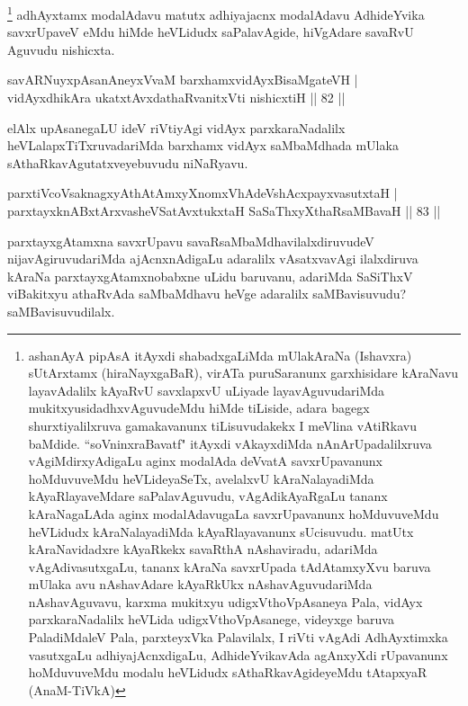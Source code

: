 \begin{artha}%
\footnote{ashanAyA pipAsA itAyxdi shabadxgaLiMda mUlakAraNa (Ishavxra) sUtArxtamx (hiraNayxgaBaR), virATa puruSaranunx garxhisidare kAraNavu layavAdalilx kAyaRvU savxlapxvU uLiyade layavAguvudariMda mukitxyusidadhxvAguvudeMdu hiMde tiLiside, adara bagegx shurxtiyalilxruva gamakavanunx tiLisuvudakekx I meVlina vAtiRkavu baMdide. ``soV\s ninxraBavatf" itAyxdi vAkayxdiMda nAnArUpadalilxruva vAgiMdirxyAdigaLu aginx modalAda deVvatA savxrUpavanunx hoMduvuveMdu heVLideyaSeTx, avelalxvU kAraNalayadiMda kAyaRlayaveMdare saPalavAguvudu, vAgAdikAyaRgaLu tananx kAraNagaLAda aginx modalAdavugaLa savxrUpavanunx hoMduvuveMdu heVLidudx kAraNalayadiMda kAyaRlayavanunx sUcisuvudu. matUtx kAraNavidadxre kAyaRkekx savaRthA nAshaviradu, adariMda vAgAdivasutxgaLu, tananx kAraNa savxrUpada tAdAtamxyXvu baruva mUlaka avu nAshavAdare kAyaRkUkx nAshavAguvudariMda nAshavAguvavu, karxma mukitxyu udigxVthoVpAsaneya Pala, vidAyx parxkaraNadalilx heVLida udigxVthoVpAsanege, videyxge baruva PaladiMdaleV Pala, parxteyxVka Palavilalx, I riVti vAgAdi AdhAyxtimxka vasutxgaLu adhiyajAcnxdigaLu, AdhideYvikavAda agAnxyXdi rUpavanunx hoMduvuveMdu modalu heVLidudx sAthaRkavAgideyeMdu tAtapxyaR (AnaM-TiVkA)} adhAyxtamx modalAdavu matutx adhiyajacnx modalAdavu AdhideYvika savxrUpaveV eMdu hiMde heVLidudx saPalavAgide, hiVgAdare savaRvU Aguvudu nishicxta.
\end{artha}

\begin{shl}
savARNuyxpAsanAneyxVvaM barxhamxvidAyxBisaMgateVH |\\
vidAyxdhikAra ukatxtAvxdathaRvanitxVti nishicxtiH \hfill || 82 ||
\end{shl}

\begin{artha}%
elAlx upAsanegaLU ideV riVtiyAgi vidAyx parxkaraNadalilx heVLalapxTiTxruvadariMda barxhamx vidAyx saMbaMdhada mUlaka sAthaRkavAgutatxveyebuvudu niNaRyavu.
\end{artha}

\begin{shl}
parxtiVcoV\s saknagxyAthAtAmxyXnomxVhAdeVshAcxpayxvasutxtaH |\\
parxtayxknABxtArxvasheVSatAvxtukxtaH SaSaThxyXthaRsaMBavaH \hfill || 83 ||
\end{shl}

\begin{artha}
parxtayxgAtamxna savxrUpavu savaRsaMbaMdhavilalxdiruvudeV nijavAgiruvudariMda ajAcnxnAdigaLu adaralilx vAsatxvavAgi ilalxdiruva kAraNa parxtayxgAtamxnobabxne uLidu baruvanu, adariMda SaSiThxV viBakitxyu athaRvAda saMbaMdhavu heVge adaralilx saMBavisuvudu? saMBavisuvudilalx.
\end{artha}

